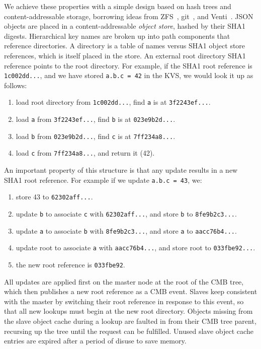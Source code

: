 We achieve these properties with a simple design based on hash trees
and content-addressable storage, borrowing ideas from
ZFS~\cite{Bonwick03thezettabyte}, git~\cite{Chacon:2009:PG:1618548}, and
Venti~\cite{Quinlan:2002:VNA:645371.651321}.
JSON objects are placed in a content-addressable
{\em object store}, hashed by their SHA1 digests.
Hierarchical key names are broken up into path components that reference
directories.
A directory is a table of names versus SHA1 object store references,
which is itself placed in the store.  An external root directory SHA1
reference points to the root directory.
For example, if the SHA1 root reference is {\tt 1c002dd...}, and we have
stored {\tt a.b.c = 42} in the KVS, we would look it up as follows:
\begin{enumerate}
\item{load root directory from {\tt 1c002dd...}, find {\tt a} is at
{\tt 3f2243ef...}.}
\item{load {\tt a} from {\tt 3f2243ef...}, find {\tt b} is at
{\tt 023e9b2d...}.}
\item{load {\tt b} from {\tt 023e9b2d...}, find {\tt c} is at
{\tt 7ff234a8...}.}
\item{load {\tt c} from {\tt 7ff234a8...}, and return it (42).}
\end{enumerate}

An important property of this structure is that any update results
in a new SHA1 root reference.  For example if we update {\tt a.b.c = 43}, we:
\begin{enumerate}
\item{store 43 to {\tt 62302aff...}.}
\item{update {\tt b} to associate {\tt c} with {\tt 62302aff...}, and store {\tt b} to {\tt 8fe9b2c3...}.}
\item{update {\tt a} to associate {\tt b} with {\tt 8fe9b2c3...}, and store {\tt a} to {\tt aacc76b4...}.}
\item{update root to associate {\tt a} with {\tt aacc76b4...}, and store root to {\tt 033fbe92...}.}
\item{the new root reference is {\tt 033fbe92}.}
\end{enumerate}

All updates are applied first on the master node at the root of the
CMB tree, which then publishes a new root reference as a CMB event.
Slaves keep consistent with the master by switching their root reference
in response to this event, so that all new lookups must begin at the
new root directory.  Objects missing from the slave object cache during
a lookup are faulted in from their CMB tree parent, recursing up the tree
until the request can be fulfilled.  Unused slave object cache entries are
expired after a period of disuse to save memory.

